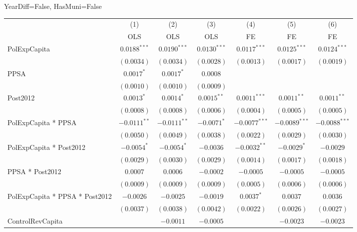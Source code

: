 \begin{table}[H]
    \centering
    \scriptsize
    \begin{minipage}{\textwidth}
    \centering
    {\normalsize YearDiff=False, HasMuni=False}
    \vspace{6pt}
    \begin{tabular}{lcccccc}
        \toprule
         & (1) & (2) & (3) & (4) & (5) & (6) \\
         & OLS & OLS & OLS & FE & FE & FE \\
        \midrule
        PolExpCapita & $0.0188^{***}$ & $0.0190^{***}$ & $0.0130^{***}$ & $0.0117^{***}$ & $0.0125^{***}$ & $0.0124^{***}$ \\
         & $(0.0034)$ & $(0.0034)$ & $(0.0028)$ & $(0.0013)$ & $(0.0017)$ & $(0.0019)$ \\[4pt]
        PPSA & $0.0017^{*}$ & $0.0017^{*}$ & $0.0008$ &  &  &  \\
         & $(0.0010)$ & $(0.0010)$ & $(0.0009)$ &  &  &  \\[4pt]
        Post2012 & $0.0013^{*}$ & $0.0014^{*}$ & $0.0015^{**}$ & $0.0011^{***}$ & $0.0011^{**}$ & $0.0011^{**}$ \\
         & $(0.0008)$ & $(0.0008)$ & $(0.0006)$ & $(0.0004)$ & $(0.0005)$ & $(0.0005)$ \\[4pt]
        PolExpCapita * PPSA & $-0.0111^{**}$ & $-0.0111^{**}$ & $-0.0071^{*}$ & $-0.0077^{***}$ & $-0.0089^{***}$ & $-0.0088^{***}$ \\
         & $(0.0050)$ & $(0.0049)$ & $(0.0038)$ & $(0.0022)$ & $(0.0029)$ & $(0.0030)$ \\[4pt]
        PolExpCapita * Post2012 & $-0.0054^{*}$ & $-0.0054^{*}$ & $-0.0036$ & $-0.0032^{**}$ & $-0.0029^{*}$ & $-0.0029$ \\
         & $(0.0029)$ & $(0.0030)$ & $(0.0029)$ & $(0.0014)$ & $(0.0017)$ & $(0.0018)$ \\[4pt]
        PPSA * Post2012 & $0.0007$ & $0.0006$ & $-0.0002$ & $-0.0005$ & $-0.0005$ & $-0.0005$ \\
         & $(0.0009)$ & $(0.0009)$ & $(0.0009)$ & $(0.0005)$ & $(0.0006)$ & $(0.0006)$ \\[4pt]
        PolExpCapita * PPSA * Post2012 & $-0.0026$ & $-0.0025$ & $-0.0019$ & $0.0037^{*}$ & $0.0037$ & $0.0036$ \\
         & $(0.0037)$ & $(0.0038)$ & $(0.0042)$ & $(0.0022)$ & $(0.0026)$ & $(0.0027)$ \\[4pt]
        ControlRevCapita &  & $-0.0011$ & $-0.0005$ &  & $-0.0023$ & $-0.0023$ \\

\end{tabular}
\end{minipage}
\end{table}
